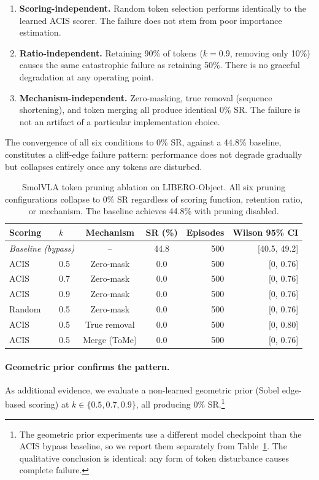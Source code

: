 \begin{enumerate}
    \item \textbf{Scoring-independent.} Random token selection performs identically to the learned ACIS scorer. The failure does not stem from poor importance estimation.
    \item \textbf{Ratio-independent.} Retaining 90\% of tokens ($k{=}0.9$, removing only 10\%) causes the same catastrophic failure as retaining 50\%. There is no graceful degradation at any operating point.
    \item \textbf{Mechanism-independent.} Zero-masking, true removal (sequence shortening), and token merging all produce identical 0\% SR. The failure is not an artifact of a particular implementation choice.
\end{enumerate}

The convergence of all six conditions to 0\% SR, against a 44.8\% baseline, constitutes a cliff-edge failure pattern: performance does not degrade gradually but collapses entirely once any tokens are disturbed.

\begin{table}[t]
\centering
\small
\caption{SmolVLA token pruning ablation on LIBERO-Object. All six pruning configurations collapse to 0\% SR regardless of scoring function, retention ratio, or mechanism. The baseline achieves 44.8\% with pruning disabled.}
\label{tab:smolvla_ablation}
\begin{tabular}{llccrr}
\toprule
Scoring & $k$ & Mechanism & SR (\%) & Episodes & Wilson 95\% CI \\
\midrule
\multicolumn{2}{l}{\textit{Baseline (bypass)}} & -- & 44.8 & 500 & [40.5, 49.2] \\
\midrule
ACIS & 0.5 & Zero-mask & 0.0 & 500 & [0, 0.76] \\
ACIS & 0.7 & Zero-mask & 0.0 & 500 & [0, 0.76] \\
ACIS & 0.9 & Zero-mask & 0.0 & 500 & [0, 0.76] \\
Random & 0.5 & Zero-mask & 0.0 & 500 & [0, 0.76] \\
ACIS & 0.5 & True removal & 0.0 & 500 & [0, 0.80] \\
ACIS & 0.5 & Merge (ToMe) & 0.0 & 500 & [0, 0.76] \\
\bottomrule
\end{tabular}
\end{table}

\paragraph{Geometric prior confirms the pattern.}
As additional evidence, we evaluate a non-learned geometric prior (Sobel edge-based scoring) at $k \in \{0.5, 0.7, 0.9\}$, all producing 0\% SR.\footnote{The geometric prior experiments use a different model checkpoint than the ACIS bypass baseline, so we report them separately from Table~\ref{tab:smolvla_ablation}. The qualitative conclusion is identical: any form of token disturbance causes complete failure.}

